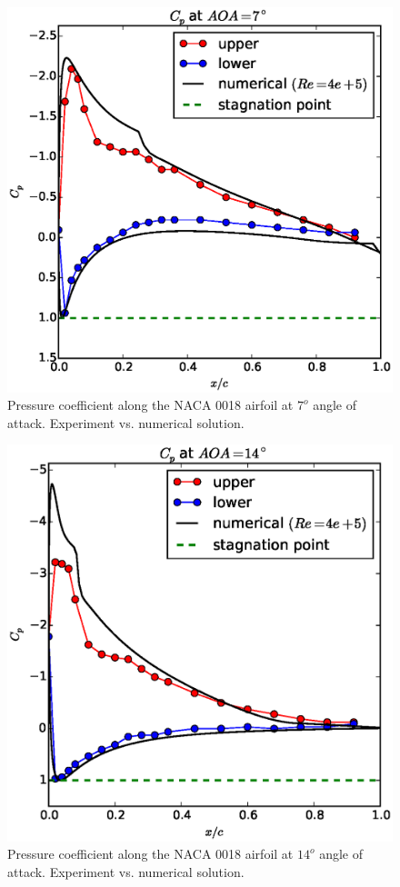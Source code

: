 \documentclass[10pt]{SelfArx} %
\begin{document}
\begin{figure}[ht!]
\centering
\includegraphics[scale=0.55]{plots/compared-cp-at-aoa7.eps}
\caption{Pressure coefficient along the NACA 0018 airfoil at $7^{o}$ angle of attack. Experiment vs. numerical solution.}
\end{figure}

\begin{figure}[ht!]
\centering
\includegraphics[scale=0.55]{plots/compared-cp-at-aoa14.eps}
\caption{Pressure coefficient along the NACA 0018 airfoil at $14^{o}$ angle of attack. Experiment vs. numerical solution.}
\end{figure}
\end{document}
